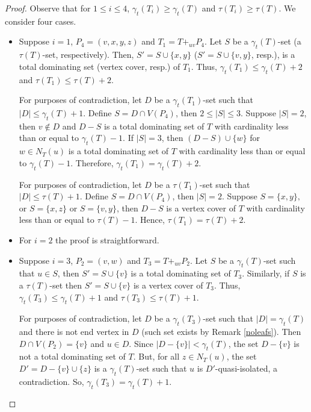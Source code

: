 \documentclass[12pt]{article}%
\theoremstyle{definition}
\begin{document}
\begin{proof}
Observe that for $1\le i \le 4$, $\gamma_t (T_i) \geq \gamma_t
(T)$ and  $\tau (T_i)\geq \tau (T)$. We consider four cases.

\begin{itemize}

\item Suppose $i = 1$, $P_4=(v,x,y,z)$ and $T_1=T+_{uv}
	P_4.$ Let $S$ be a $\gamma_t(T)$-set (a $\tau (T)$-set,
	respectively). Then,   $S' = S \cup \{ x,y\}$ ($S' = S \cup
	\{ v,y\}$, resp.), is a total dominating set (vertex cover,
	resp.) of $T_1$.   Thus,  $\gamma_t (T_1) \le \gamma_t
	(T) + 2$ and  $\tau (T_1) \le \tau(T) + 2.$  

	For purposes of contradiction, let $D$ be a $\gamma_t
	(T_1)$-set such that $|D| \le \gamma_t (T) + 1.$ Define
	$S=D\cap V(P_4)$, then $2\leq |S|\leq 3.$ Suppose
	$|S|=2$, then $v\notin D$ and $D-S$ is a total dominating
	set of $T$ with cardinality less than or equal to  $\gamma_t
	(T) - 1.$ If $|S| = 3$, then $(D-S)\cup \{w\}$ for $w\in N_T(u)$
	is a total dominating set of $T$ with cardinality less than or
	equal to $\gamma_t (T) - 1.$ Therefore, $\gamma_t (T_1)
	= \gamma_t (T) + 2.$ 

	For purposes of contradiction, let $D$ be a $\tau (T_1)$-set
	such that $|D| \le \tau (T) + 1.$ Define $S=D\cap V(P_4)$,
	then $|S|=2$. Suppose $S = \{ x, y \},$ or $S=\{ x, z\}$ or $S =
	\{ v, y \}$, then $D-S$ is a vertex cover of $T$ with cardinality
	less than or equal to  $\tau (T) - 1.$ Hence, $\tau (T_1) =
	\tau(T) + 2.$     

\item For $i=2$ the proof is straightforward.

\item Suppose $i = 3$, $P_2=(v,w)$ and $T_3=T+_{uv}P_2.$
	Let $S$ be a $\gamma_t(T)$-set such that $u\in S$, then
	$S' = S \cup \{ v\}$ is a total dominating set of $T_3$.
	Similarly, if $S$ is a $\tau (T)$-set then $S' = S \cup \{ v \}$
	is a vertex cover of $T_3$.  Thus,  $\gamma_t (T_3) \le
	\gamma_t (T) + 1$ and  $\tau (T_3) \le \tau(T) + 1.$

	For purposes of contradiction, let $D$ be a $\gamma_t
	(T_3)$-set such that $|D|= \gamma_t (T)$ and there is
	not end vertex in $D$ (such set exists by Remark
	\ref{noleafs}). Then $D\cap V(P_2)=\{v\}$ and $u\in D$.
	Since  $|D-\{v\}|<\gamma_t (T)$, the set $D-\{ v\}$ is not
	a total dominating set of $T$. But, for all $z\in N_T(u)$,
	the set $D' = D - \{ v \} \cup \{ z \}$ is a $\gamma _t (T)$-set
	such that $u$ is $D'$-quasi-isolated, a contradiction. So,
	$\gamma_t (T_3)=\gamma_t (T) + 1$. 


\end{itemize}
\end{proof}
\end{document}
